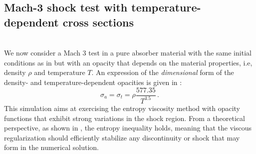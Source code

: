 \documentclass[times,doublespace]{fldauth}%
\begin{document}
\subsection{Mach-3 shock test with temperature-dependent cross sections}\label{sec:mach-3-no-cst-xs}
%
 \\
We now consider a Mach 3 test in a pure absorber material with the same initial conditions as in  but with an opacity that depends on the material properties, i.e, density $\rho$ and temperature $T$. An expression of the \emph{dimensional} form of the density- and  temperature-dependent opacities is given in :
%
\begin{equation}\label{eq:opacity}
\sigma_a = \sigma_t = \rho \frac{577.35}{T^{3.5}}\, .
\end{equation}
%
This simulation aims at exercising the entropy viscosity method with opacity functions that exhibit strong variations in the shock region. From a theoretical perspective, as shown in , the entropy inequality holds, meaning that the viscous regularization should efficiently stabilize any discontinuity or shock that may form in the numerical solution. 
\end{document}
